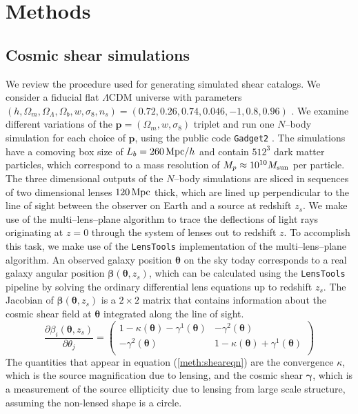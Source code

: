 \documentclass[reprint,aps,prd,superscriptaddress,showkeys,showpacs]{revtex4-1}
\newcommand{\bb}[1]{\mathbf{#1}}
\newcommand{\ttt}[1]{\texttt{#1}}
\begin{document}

\section{Methods}
\label{sec:methods}


\subsection{Cosmic shear simulations}
\label{sec:shearsim}
We review the procedure used for generating simulated shear catalogs. We consider a fiducial flat $\Lambda$CDM universe with parameters $(h,\Omega_m,\Omega_\Lambda,\Omega_b,w,\sigma_8,n_s)=(0.72,0.26,0.74,0.046,-1,0.8,0.96)$ \citep{WMAP9,PlanckCosmo}. We examine different variations of the $\bb{p}=(\Omega_m,w,\sigma_8)$ triplet and run one $N$--body simulation for each choice of $\bb{p}$, using the public code \ttt{Gadget2} \citep{Gadget2}. The simulations have a comoving box size of $L_b=260\,{\rm Mpc}/h$ and contain $512^3$ dark matter particles, which correspond to a mass resolution of $M_p\approx 10^{10}M_{\rm sun}$ per particle. The three dimensional outputs of the $N$--body simulations are sliced in sequences of two dimensional lenses $120 \,{\rm Mpc}$ thick, which are lined up perpendicular to the line of sight between the observer on Earth and a source at redshift $z_s$. We make use of the multi--lens--plane algorithm \citep{RayTracingJain,RayTracingHartlap} to trace the deflections of light rays originating at $z=0$ through the system of lenses out to redshift $z$. To accomplish this task, we make use of the \ttt{LensTools} \citep{LensTools-ASCL,LensTools-paper} implementation of the multi--lens--plane algorithm. An observed galaxy position $\pmb{\theta}$ on the sky today corresponds to a real galaxy angular position $\pmb{\beta}(\pmb{\theta},z_s)$, which can be calculated using the \ttt{LensTools} pipeline by solving the ordinary differential lens equations up to redshift $z_s$. The Jacobian of $\pmb{\beta}(\pmb{\theta},z_s)$ is a $2\times 2$ matrix that contains information about the cosmic shear field at $\pmb{\theta}$ integrated along the line of sight. 
%
\begin{equation}
\label{meth:sheareqn}
\frac{\partial\beta_i(\pmb{\theta},z_s)}{\partial \theta_j} = 
\begin{pmatrix}
1-\kappa(\pmb{\theta})-\gamma^1(\pmb{\theta}) & -\gamma^2(\pmb{\theta}) \\
-\gamma^2(\pmb{\theta}) & 1-\kappa(\pmb{\theta})+\gamma^1(\pmb{\theta})\\
\end{pmatrix}
\end{equation}  
%
The quantities that appear in equation (\ref{meth:sheareqn}) are the convergence $\kappa$, which is the source magnification due to lensing, and the cosmic shear $\pmb{\gamma}$, which is a measurement of the source ellipticity due to lensing from large scale structure, assuming the non-lensed shape is a circle. 
\end{document}
